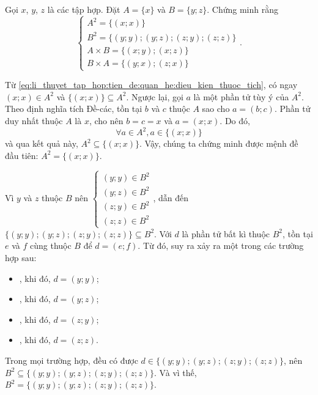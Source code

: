 \exercise Gọi $x$, $y$, $z$ là các tập hợp. Đặt $A = \{x\}$ và $B = \{y; z\}$. Chứng minh rằng \begin{equation*}
   \begin{cases}
      A^2 = \{(x; x)\} \\
      B^2 = \{(y; y); (y; z); (z; y); (z; z)\} \\
      A \times B = \{(x; y); (x; z)\} \\
      B \times A = \{(y; x); (z; x)\}
   \end{cases}.
\end{equation*}

\solution

Từ \eqref{eq:li_thuyet_tap_hop:tien_de:quan_he:dieu_kien_thuoc_tich}, có ngay $(x; x) \in A^2$ và $\{(x; x)\} \subseteq A^2$. Ngược lại, gọi $a$ là một phần tử tùy ý của $A^2$. Theo định nghĩa tích Đề-các, tồn tại $b$ và $c$ thuộc $A$ sao cho $a = (b; c)$. Phần tử duy nhất thuộc $A$ là $x$, cho nên $b = c = x$ và $a = (x; x)$. Do đó, $$\forall a \in A^2, a \in \{(x; x)\}$$
và qua kết quả này, $A^2 \subseteq \{(x; x)\}$. Vậy, chúng ta chứng minh được mệnh đề đầu tiên: $A^2 = \{(x; x)\}$.

Vì $y$ và $z$ thuộc $B$ nên $\begin{cases}
   (y; y) \in B^2 \\
   (y; z) \in B^2 \\
   (z; y) \in B^2 \\
   (z; z) \in B^2
\end{cases}$, dẫn đến $\{(y; y); (y; z); (z; y); (z; z)\} \subseteq B^2$. Với $d$ là phần tử bất kì thuộc $B^2$, tồn tại $e$ và $f$ cùng thuộc $B$ để $d = (e; f)$. Từ đó, suy ra xảy ra một trong các trường hợp sau:
\begin{itemize}
   \item {}, khi đó, $d = (y; y)$; 
   \item {}, khi đó, $d = (y; z)$; 
   \item {}, khi đó, $d = (z; y)$; 
   \item {}, khi đó, $d = (z; z)$.
\end{itemize}
Trong mọi trường hợp, đều có được $d \in \{(y; y); (y; z); (z; y); (z; z)\}$, nên $B^2 \subseteq \{(y; y); (y; z); (z; y); (z; z)\}$. Và vì thế, $B^2 = \{(y; y); (y; z); (z; y); (z; z)\}$.


